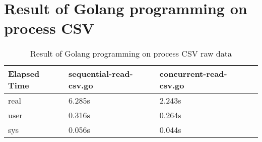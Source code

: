 \section{Result of Golang programming on process CSV}

\begin{table}[H]
	\centering
	\begin{tabulary}{1.0\textwidth}{|L|L|L|L}
		\hline
		{\bf Elapsed Time} & {\bf sequential-read-csv.go}  & {\bf concurrent-read-csv.go} \\ \hline
		real      & 6.285s                    &  2.243s                  \\ \hline
		user     & 0.316s                    &  0.264s                  \\ \hline
		sys       & 0.056s                    &  0.044s                  \\ \hline
	\end{tabulary}
	\caption{Result of Golang programming on process CSV raw data}
\end{table}






